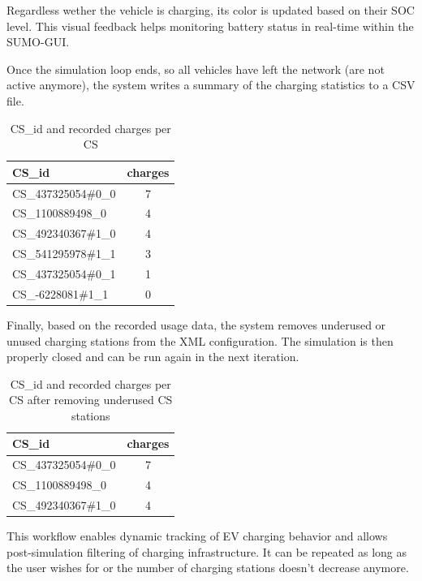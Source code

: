 Regardless wether the vehicle is charging, its color is updated based on their SOC level. This visual feedback helps monitoring battery status in real-time within the SUMO-GUI.

Once the simulation loop ends, so all vehicles have left the network (are not active anymore), the system writes a summary of the charging statistics to a CSV file.

\begin{table}[ht]
\centering
\begin{tabular}{|l|c|}
\hline
\rowcolor{gray!20}
\textbf{CS\_id} & \textbf{charges} \\ \hline
CS\_437325054\#0\_0 & 7 \\ \hline
CS\_1100889498\_0   & 4 \\ \hline
CS\_492340367\#1\_0 & 4 \\ \hline
CS\_541295978\#1\_1 & 3 \\ \hline
CS\_437325054\#0\_1 & 1 \\ \hline
CS\_-6228081\#1\_1  & 0 \\ \hline
\end{tabular}
\caption{CS\_id and recorded charges per CS}
\label{tab:cs_charges}
\end{table}

Finally, based on the recorded usage data, the system removes underused or unused charging stations from the XML configuration. The simulation is then properly closed and can be run again in the next iteration.

\begin{table}[ht]
\centering
\begin{tabular}{|l|c|}
\hline
\rowcolor{gray!20}
\textbf{CS\_id} & \textbf{charges} \\ \hline
CS\_437325054\#0\_0 & 7 \\ \hline
CS\_1100889498\_0   & 4 \\ \hline
CS\_492340367\#1\_0 & 4 \\ \hline
\end{tabular}
\caption{CS\_id and recorded charges per CS after removing underused CS stations}
\label{tab:cs_charges2}
\end{table}

This workflow enables dynamic tracking of EV charging behavior and allows post-simulation filtering of charging infrastructure. It can be repeated as long as the user wishes for or the number of charging stations doesn't decrease anymore.


